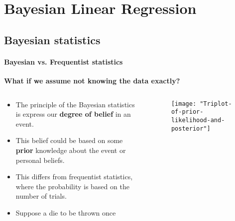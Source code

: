 \section{Bayesian Linear Regression}

\framecard{\insertsection}

\subsection{Bayesian statistics}

\begin{frame}{\insertsection}
	\framesubtitle{Bayesian vs. Frequentist statistics}
	
	\textcolor{UniGold}{\textbf{What if we assume not knowing the data exactly?}}

	\begin{columns}
		\begin{column}{0.475\textwidth}
			\begin{itemize}
				\item The principle of the Bayesian statistics is express our \textcolor{UniOrange}{\textbf{degree of belief}} in an event.
				\item This belief could be based on some \textcolor{UniOrange}{\textbf{prior}} knowledge about the event or personal beliefs.
				\item This differs from frequentist statistics, where the probability is based on the number of trials.
				\item Suppose a die to be thrown once
			\end{itemize}
			\end{column}
			\begin{column}{0.475\textwidth}   
				\centering
				\begin{figure}
					\texttt{[image: "Triplot-of-prior-likelihood-and-posterior"]}
				\caption{\cite{AksuAnil2018}}
				\end{figure}
			\end{column}
		\end{columns}
\end{frame}
	
